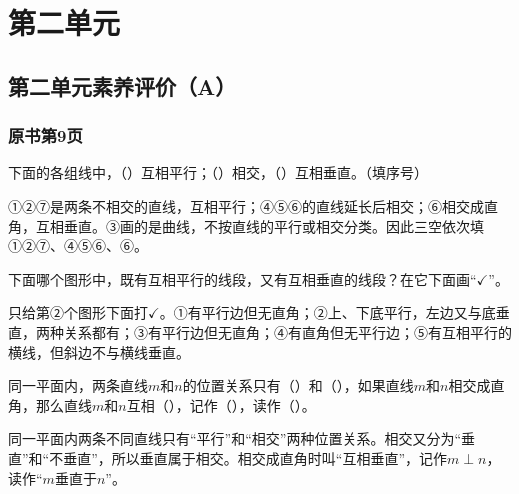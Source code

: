 \chapter{第二单元}


\section{第二单元素养评价（A）}



\subsection*{原书第9页}

下面的各组线中，（\hspace{1.8em}）互相平行；（\hspace{1.8em}）相交，（\hspace{1.8em}）互相垂直。（填序号）\par
{}
\begin{BookAnswer}
①②⑦是两条不相交的直线，互相平行；④⑤⑥的直线延长后相交；⑥相交成直角，互相垂直。③画的是曲线，不按直线的平行或相交分类。因此三空依次填①②⑦、④⑤⑥、⑥。
\end{BookAnswer}

下面哪个图形中，既有互相平行的线段，又有互相垂直的线段？在它下面画“\(\checkmark\)”。\par
{}
\begin{BookAnswer}
只给第②个图形下面打\(\checkmark\)。①有平行边但无直角；②上、下底平行，左边又与底垂直，两种关系都有；③有平行边但无直角；④有直角但无平行边；⑤有互相平行的横线，但斜边不与横线垂直。
\end{BookAnswer}

同一平面内，两条直线\(m\)和\(n\)的位置关系只有（\hspace{1.8em}）和（\hspace{1.8em}），如果直线\(m\)和\(n\)相交成直角，那么直线\(m\)和\(n\)互相（\hspace{1.8em}），记作（\hspace{1.8em}），读作（\hspace{1.8em}）。\par
\begin{BookAnswer}
同一平面内两条不同直线只有“平行”和“相交”两种位置关系。相交又分为“垂直”和“不垂直”，所以垂直属于相交。相交成直角时叫“互相垂直”，记作\(m\perp n\)，读作“\(m\)垂直于\(n\)”。
\end{BookAnswer}

